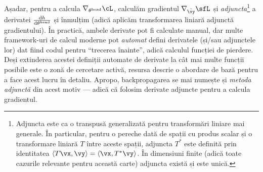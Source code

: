 \documentclass[../../book-main_ro.tex]{subfiles}
\begin{document}
Așadar, pentru a calcula \(\nabla_{\theta^{\head}}\cL\), calculăm gradientul \(\nabla_{\hat{\vy}}\sfL\) și \textit{adjuncta}\footnote{Adjuncta este ca o transpusă generalizată pentru transformări liniare mai generale. În particular, pentru o pereche dată de spații cu produs scalar și o transformare liniară \(T\) între aceste spații, adjuncta \(T^{*}\) este definită prin identitatea \(\ip{T\vx}{\vy} = \ip{\vx}{T^{*}\vy}\). În dimensiuni finite (adică toate cazurile relevante pentru această carte) adjuncta există și este unică.} a derivatei \(\odv{h}{\theta^{\head}}\) și înmulțim (adică aplicăm transformarea liniară adjunctă gradientului). În practică, ambele derivate pot fi calculate manual, dar multe framework-uri de calcul moderne pot \textit{automat} defini derivatele (și/sau adjunctele lor) dat fiind codul pentru ``trecerea înainte'', adică calculul funcției de pierdere. Deși extinderea acestei definiții automate de derivate la cât mai multe funcții posibile este o zonă de cercetare activă, resursa \cite{bright2025matrix} descrie o abordare de bază pentru a face acest lucru în detaliu. Apropo, backpropagarea se mai numește și \textit{metoda adjunctă} din acest motiv --- adică că folosim derivate adjuncte pentru a calcula gradientul.
\end{document}
